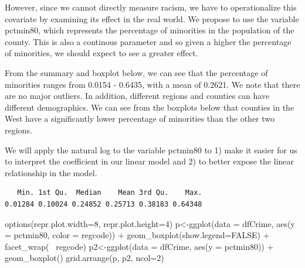 \documentclass[]{article}
\newenvironment{Shaded}{}{}
\newcommand{\DataTypeTok}[1]{#1}
\newcommand{\DecValTok}[1]{#1}
\newcommand{\KeywordTok}[1]{\textcolor[rgb]{0.00,0.00,1.00}{#1}}
\newcommand{\NormalTok}[1]{#1}
\newcommand{\OperatorTok}[1]{#1}
\newcommand{\OtherTok}[1]{\textcolor[rgb]{1.00,0.25,0.00}{#1}}
\newcommand{\StringTok}[1]{\textcolor[rgb]{0.00,0.50,0.50}{#1}}
\begin{document}
However, since we cannot directly measure racism, we have to
operationalize this covariate by examining its effect in the real world.
We propose to use the variable pctmin80, which represents the percentage
of minorities in the population of the county. This is also a continous
parameter and so given a higher the percentage of minorities, we should
expect to see a greater effect.

From the summary and boxplot below, we can see that the percentage of
minorities ranges from 0.0154 - 0.6435, with a mean of 0.2621. We note
that there are no major outliers. In addition, different regions and
counties can have different demographics. We can see from the boxplots
below that counties in the West have a significantly lower percentage of
minorities than the other two regions.

We will apply the natural log to the variable pctmin80 to 1) make it
easier for us to interpret the coefficient in our linear model and 2) to
better expose the linear relationship in the model.

\begin{Shaded}
\end{Shaded}

\begin{verbatim}
   Min. 1st Qu.  Median    Mean 3rd Qu.    Max. 
0.01284 0.10024 0.24852 0.25713 0.38183 0.64348 
\end{verbatim}

\begin{Shaded}
\begin{Highlighting}[]
\KeywordTok{options}\NormalTok{(}\DataTypeTok{repr.plot.width=}\DecValTok{8}\NormalTok{, }\DataTypeTok{repr.plot.height=}\DecValTok{4}\NormalTok{)}
\NormalTok{p<-}\KeywordTok{ggplot}\NormalTok{(}\DataTypeTok{data =}\NormalTok{ dfCrime, }\KeywordTok{aes}\NormalTok{(}\DataTypeTok{y =}\NormalTok{ pctmin80, }\DataTypeTok{color =}\NormalTok{ regcode)) }\OperatorTok{+}
\StringTok{     }\KeywordTok{geom_boxplot}\NormalTok{(}\DataTypeTok{show.legend=}\OtherTok{FALSE}\NormalTok{) }\OperatorTok{+}\StringTok{ }\KeywordTok{facet_wrap}\NormalTok{(}\OperatorTok{~}\StringTok{ }\NormalTok{regcode)}
\NormalTok{p2<-}\KeywordTok{ggplot}\NormalTok{(}\DataTypeTok{data =}\NormalTok{ dfCrime, }\KeywordTok{aes}\NormalTok{(}\DataTypeTok{y =}\NormalTok{ pctmin80)) }\OperatorTok{+}
\StringTok{     }\KeywordTok{geom_boxplot}\NormalTok{()}
\KeywordTok{grid.arrange}\NormalTok{(p, p2, }\DataTypeTok{ncol=}\DecValTok{2}\NormalTok{)}
\end{Highlighting}
\end{Shaded}
\end{document}
